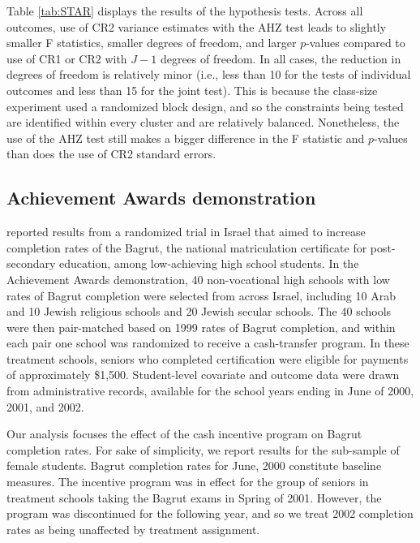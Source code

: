\documentclass[12pt]{article}\usepackage[]{graphicx}\usepackage[]{color}
\begin{document}
Table \ref{tab:STAR} displays the results of the hypothesis tests. Across all outcomes, use of CR2 variance estimates with the AHZ test leads to slightly smaller F statistics, smaller degrees of freedom, and larger $p$-values compared to use of CR1 or CR2 with $J - 1$ degrees of freedom. In all cases, the reduction in degrees of freedom is relatively minor (i.e., less than 10 for the tests of individual outcomes and less than 15 for the joint test). This is because the class-size experiment used a randomized block design, and so the constraints being tested are identified within every cluster and are relatively balanced. Nonetheless, the use of the AHZ test still makes a bigger difference in the F statistic and $p$-values than does the use of CR2 standard errors.

\subsection{Achievement Awards demonstration} 

\citet{Angrist2009effects} reported results from a randomized trial in Israel that aimed to increase completion rates of the Bagrut, the national matriculation certificate for post-secondary education, among low-achieving high school students. 
In the Achievement Awards demonstration, 40 non-vocational high schools with low rates of Bagrut completion were selected from across Israel, including 10 Arab and 10 Jewish religious schools and 20 Jewish secular schools. 
The 40 schools were then pair-matched based on 1999 rates of Bagrut completion, and within each pair one school was randomized to receive a cash-transfer program. 
In these treatment schools, seniors who completed certification were eligible for payments of approximately \$1,500. 
Student-level covariate and outcome data were drawn from administrative records, available for the school years ending in June of 2000, 2001, and 2002. 

Our analysis focuses the effect of the cash incentive program on Bagrut completion rates. 
For sake of simplicity, we report results for the sub-sample of female students.
Bagrut completion rates for June, 2000 constitute baseline measures. 
The incentive program was in effect for the group of seniors in treatment schools taking the Bagrut exams in Spring of 2001. 
However, the program was discontinued for the following year, and so we treat 2002 completion rates as being unaffected by treatment assignment.
\end{document}

